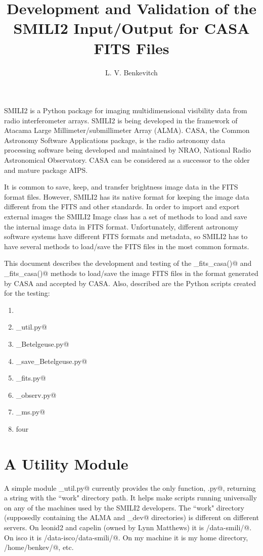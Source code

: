 \documentclass[preprint]{aastex}
\begin{document}
\title{Development and Validation of the SMILI2 Input/Output for CASA FITS Files}

\author{L. V. Benkevitch}

SMILI2 is a Python package for imaging multidimensional visibility data from radio interferometer arrays. SMILI2 is being developed in the framework of Atacama Large Millimeter/submillimeter Array (ALMA). CASA, the Common Astronomy Software Applications package, is the radio astronomy data processing software being developed and maintained by NRAO, National Radio Astronomical Observatory. CASA can be considered as a successor to the older and mature package AIPS. 

It is common to save, keep, and transfer brightness image data in the FITS format files. However, SMILI2 has its native format for keeping the image data different from the FITS and other standards. In order to import and export external images the SMILI2 Image class has a set of methods to load and save the internal image data in FITS format. Unfortunately, different astronomy software systems have different FITS formats and metadata, so SMILI2 has to have several methods to load/save the FITS files in the most common formats.

This document describes the development and testing of the \verb@load_fits_casa()@ and \verb@to_fits_casa()@ methods to load/save the image FITS files in the format generated by CASA and accepted by CASA. Also, described are the Python scripts created for the testing: 

\begin{enumerate}
  \item \verb@@
  \item \verb@alma_util.py@
  \item \verb@RoundSpottyDisk_Betelgeuse.py@
  \item \verb@load_save_Betelgeuse.py@
  \item \verb@diff_fits.py@
  \item \verb@sim_observ.py@
  \item \verb@diff_ms.py@
  \item four
\end{enumerate}


\section{A Utility Module}

A simple module \verb@alma_util.py@ currently provides the only function, \verb@workdir.py@, returning a string with the ``work" directory path. It helps make scripts running universally on any of the machines used by the SMILI2 developers. The ``work" directory (supposedly containing the ALMA and _dev@ directories) is different on different servers. On leonid2 and capelin (owned by Lynn Matthews) it is \verb@/data-smili/@. On isco it is \verb@/data-isco/data-smili/@. On my machine it is my home directory, \verb@/home/benkev/@, etc. 
\end{document}
